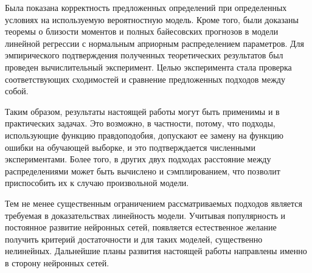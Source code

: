Была показана корректность предложенных определений при определенных условиях на используемую вероятностную модель. Кроме того, были доказаны теоремы о близости моментов и полных байесовских прогнозов в модели линейной регрессии с нормальным априорным распределением параметров. Для эмпирического подтверждения полученных теоретических результатов был проведен вычислительный эксперимент. Целью эксперимента стала проверка соответствующих сходимостей и сравнение предложенных подходов между собой.

Таким образом, результаты настоящей работы могут быть применимы и в практических задачах. Это возможно, в частности, потому, что подходы, использующие функцию правдоподобия, допускают ее замену на функцию ошибки на обучающей выборке, и это подтверждается численными экспериментами. Более того, в других двух подходах расстояние между распределениями может быть вычислено и сэмплированием, что позволит приспособить их к случаю произвольной модели. 

Тем не менее существенным ограничением рассматриваемых подходов является требуемая в доказательствах линейность модели. Учитывая популярность и постоянное развитие нейронных сетей, появляется естественное желание получить критерий достаточности и для таких моделей, существенно нелинейных. Дальнейшие планы развития настоящей работы направлены именно в сторону нейронных сетей.